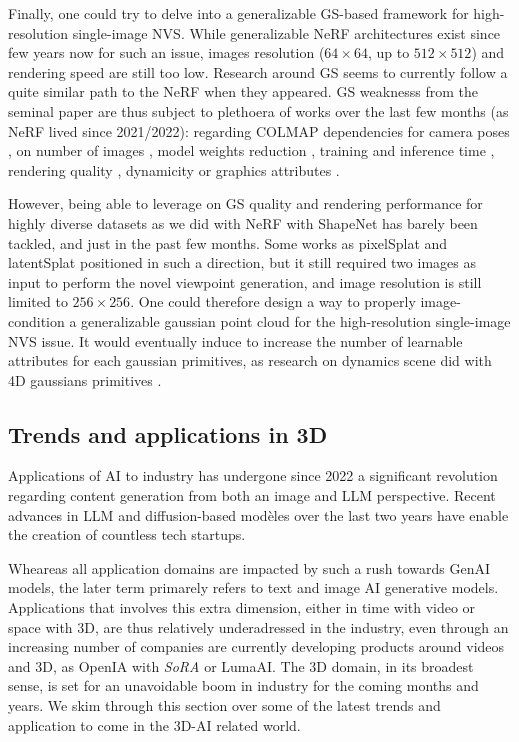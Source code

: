 Finally, one could try to delve into a generalizable \ac{GS}-based framework for high-resolution single-image \ac{NVS}. While generalizable \ac{NeRF} architectures exist since few years now \citep{yu2021pixelnerf,li2022symmnerf,lin2023vision} for such an issue, images resolution ($64\times 64$, up to $512\times 512$) and rendering speed are still too low. Research around \ac{GS} seems to currently follow a quite similar path to the \ac{NeRF} when they appeared. \ac{GS} weaknesss from the seminal paper \citep{kerbl20233d} are thus subject to plethoera of works over the last few months (as \ac{NeRF} lived since 2021/2022): regarding COLMAP dependencies for camera poses \citep{fu2023colmapfree}, on number of images \citep{xiong2023sparsegs,yang2024gaussianobject}, model weights reduction \citep{niedermayr2023compressed}, training and inference time \citep{fan2024instantsplat}, rendering quality \citep{yu2023mip} , dynamicity \citep{luiten2023dynamic} or graphics attributes \citep{wu2024deferredgs}.  

However, being able to leverage on \ac{GS} quality and rendering performance for highly diverse datasets as we did with NeRF \citep{landreau2024epinerf} with ShapeNet \citep{chang2015shapenet} has barely been tackled, and just in the past few months. Some works as pixelSplat \citep{charatan23pixelsplat} and latentSplat \citep{wewer24latentsplat} positioned in such a direction, but it still required two images as input to perform the novel viewpoint generation, and image resolution is still limited to $256\times 256$. One could therefore design a way to properly image-condition a generalizable gaussian point cloud for the high-resolution single-image \ac{NVS} issue. It would eventually induce to increase the number of learnable attributes for each gaussian primitives, as research on dynamics scene did with 4D gaussians primitives \citep{luiten2023dynamic,gao2024gaussianflow}.  


\subsection{Trends and applications in 3D}
Applications of \ac{AI} to industry has undergone since 2022 a significant revolution regarding content generation from both an image and \ac{LLM} perspective. Recent advances in \ac{LLM} and diffusion-based modèles over the last two years have enable the creation of countless tech startups. 

Wheareas all application domains are impacted by such a rush towards \ac{GenAI} models, the later term primarely refers to text and image \ac{AI} generative models. Applications that involves this extra dimension, either in time with video or space with 3D, are thus relatively underadressed in the industry, even through an increasing number of companies are currently developing products around videos and 3D, as OpenIA with \textit{SoRA} or LumaAI. The 3D domain, in its broadest sense, is set for an unavoidable boom in industry for the coming months and years. We skim through this section over some of the latest trends and application to come in the 3D-\ac{AI} related world. 


